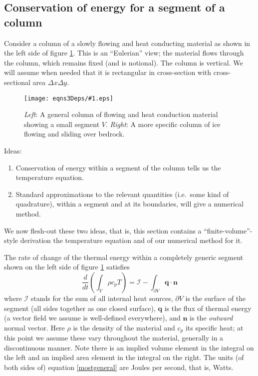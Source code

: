 \documentclass[12pt,final]{amsart}%
\theoremstyle{plain}
\theoremstyle{definition}
\theoremstyle{remark}
\newcommand{\regfigure}[2]{\texttt{[image: eqns3Deps/\#1.eps]}}
\newcommand{\DDt}[1]{\ensuremath{\frac{d #1}{d t}}}
\newcommand{\nhat}{\mathbf{n}}
\newcommand{\bq}{{\mathbf{q}}}
\begin{document}
\subsection*{Conservation of energy for a segment of a column}  Consider a column of a slowly flowing and heat conducting material as shown in the left side of figure \ref{fig:earlycols}.  This is an ``Eulerian'' view; the material flows through the column, which remains fixed (and is notional).  The column is vertical.  We will assume when needed that it is rectangular in cross-section with cross-sectional area $\Delta x\Delta y$.

\begin{figure}[ht]
\vspace{0.2in}
\hspace{1.0in}\regfigure{earlycols}{2.6}
\vspace{0.2in}
\caption{\emph{Left}: A general column of flowing and heat conduction material showing a small segment $V$.  \emph{Right}: A more specific column of ice flowing and sliding over bedrock.}
\label{fig:earlycols}
\end{figure}

Ideas: \begin{enumerate}
\item Conservation of energy within a segment of the column  tells us the temperature equation.
\item Standard approximations to the relevant quantities (i.e.~some kind of quadrature), within a segment and at its boundaries, will give a numerical method.\end{enumerate}
We now flesh-out these two ideas, that is, this section contains a ``finite-volume''-style derivation the temperature equation and of our numerical method for it.

The rate of change of the thermal energy within a completely generic segment shown on the left side of figure \ref{fig:earlycols} satisfies
\begin{equation}\label{mostgeneral}
\DDt{}\left(\int_V \rho c_p T\right) = \mathcal{I} - \int_{\partial V} \bq \cdot \nhat
\end{equation}
where $\mathcal{I}$ stands for the sum of all internal heat sources, $\partial V$ is the surface of the segment (all sides together as one closed surface), $\bq$ is the flux of thermal energy (a vector field we assume is well-defined everywhere), and $\nhat$ is the \emph{outward} normal vector.  Here $\rho$ is the density of the material and $c_p$ its specific heat; at this point we assume these vary throughout the material, generally in a discontinuous manner.  Note there is an implied volume element in the integral on the left and an implied area element in the integral on the right.  The units (of both sides of) equation \eqref{mostgeneral} are Joules per second, that is, Watts.
\end{document}
